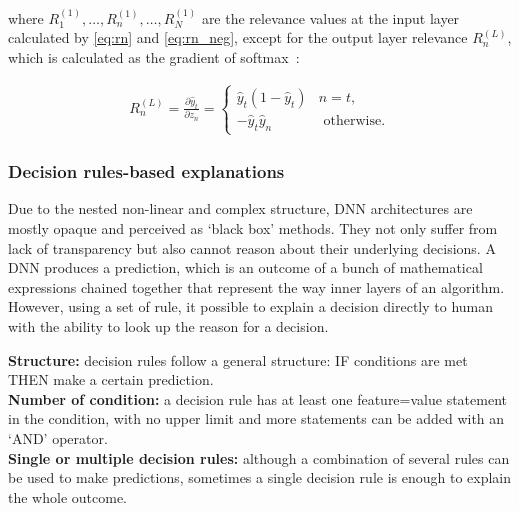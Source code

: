 where $R_{1}^{(1)}, \ldots, R_{n}^{(1)}, \ldots, R_{N}^{(1)}$ are the relevance values at the input layer calculated by \cref{eq:rn} and \cref{eq:rn_neg}, except for the output layer relevance $R_{n}^{(L)}$, which is calculated as the gradient of softmax~\cite{LRP2}:

\vspace{-2mm}
\begin{align}
        R_{n}^{(L)}=\frac{\partial \hat{y}_{t}}{\partial z_{n}}=\left\{\begin{array}{ll}
        {\hat{y}_{t}\left(1-\hat{y}_{t}\right)} & {n=t}, \\
        {-\hat{y}_{t} \hat{y}_{n}} & {\text { otherwise.}}
    \end{array}\right.
\end{align}

\subsubsection{Decision rules-based explanations}
Due to the nested non-linear and complex structure, DNN architectures are mostly opaque and perceived as `black box' methods. They not only suffer from lack of transparency but also cannot reason about their underlying decisions. A DNN produces a prediction, which is an outcome of a bunch of mathematical expressions chained together that represent the way inner layers of an algorithm. However, using a set of rule, it possible to explain a decision directly to human with the ability to look up the reason for a decision. \\

\vspace{-2mm}
\begin{tcolorbox}[colback=white!3!white,colframe=gray!120!black,title=\faBook~Decision rules]
    \scriptsize{
    \textbf{Structure:} decision rules follow a general structure: IF conditions are met THEN make a certain prediction. \\
    \textbf{Number of condition:} a decision rule has at least one feature=value statement in the condition, with no upper limit and more statements can be added with an ‘AND’ operator. \\
    \textbf{Single or multiple decision rules:} although a combination of several rules can be used to make predictions, sometimes a single decision rule is enough to explain the whole outcome.
}
\end{tcolorbox}

